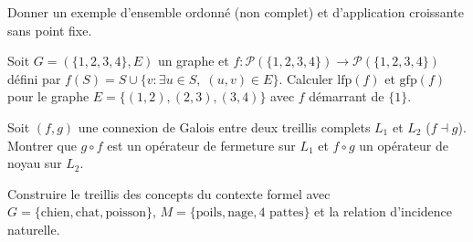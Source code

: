 \begin{exercice}
Donner un exemple d'ensemble ordonn\'e (non complet) et d'application croissante sans
point fixe.
\end{exercice}

\begin{exercice}
Soit $G = (\{1,2,3,4\}, E)$ un graphe et $f\colon \mathcal{P}(\{1,2,3,4\}) \to
\mathcal{P}(\{1,2,3,4\})$ d\'efini par $f(S) = S \cup \{v : \exists u \in S, \; (u,v) \in E\}$.
Calculer $\mathrm{lfp}(f)$ et $\mathrm{gfp}(f)$ pour le graphe
$E = \{(1,2), (2,3), (3,4)\}$ avec $f$ d\'emarrant de $\{1\}$.
\end{exercice}

\begin{exercice}
Soit $(f, g)$ une connexion de Galois entre deux treillis complets $L_1$ et $L_2$
($f \dashv g$). Montrer que $g \circ f$ est un op\'erateur de fermeture sur $L_1$ et
$f \circ g$ un op\'erateur de noyau sur $L_2$.
\end{exercice}

\begin{exercice}
Construire le treillis des concepts du contexte formel avec $G = \{\text{chien},
\text{chat}, \text{poisson}\}$, $M = \{\text{poils}, \text{nage}, \text{4 pattes}\}$ et
la relation d'incidence naturelle.
\end{exercice}
